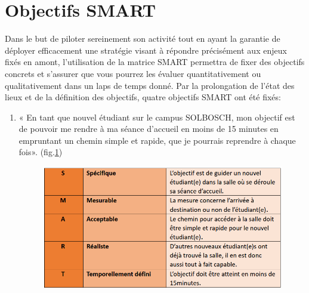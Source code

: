 \section{Objectifs SMART}
Dans le but de piloter sereinement son activité tout en ayant la garantie de déployer efficacement une stratégie visant à répondre précisément aux enjeux fixés en amont, l’utilisation de la matrice SMART permettra de fixer des objectifs concrets et s’assurer que vous pourrez les évaluer quantitativement ou qualitativement dans un laps de temps donné. 
Par la prolongation de l’état des lieux et de la définition des objectifs, quatre objectifs SMART ont été fixés: 
\begin{enumerate}
    \item « En tant que nouvel étudiant sur le campus SOLBOSCH, mon objectif est de pouvoir me rendre à ma séance d’accueil en moins de 15 minutes en empruntant un chemin simple et rapide, que je pourrais reprendre à chaque fois». (fig.\ref{smart1})
    \begin{figure} [h]
        \label{smart1} \caption{}
        \centering
        \includegraphics[width=13cm]{Pictures/smart1.png}
    \end{figure}



\end{enumerate}
